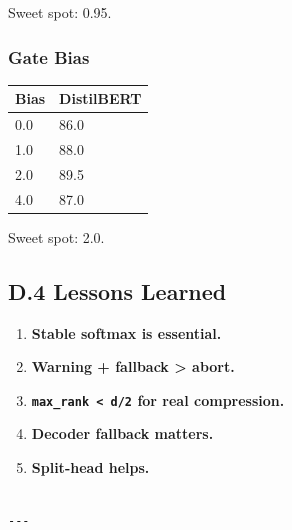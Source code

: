 Sweet spot: 0.95.

\subsubsection{Gate Bias}

\begin{table}[H]
\centering
\small
\begin{tabular}{ll}
\toprule
\textbf{Bias} & \textbf{DistilBERT} \\
\midrule
0.0 & 86.0 \\
1.0 & 88.0 \\
2.0 & 89.5 \\
4.0 & 87.0 \\
\bottomrule
\end{tabular}
\end{table}

Sweet spot: 2.0.

\subsection{D.4 Lessons Learned}

\begin{enumerate}
\item \textbf{Stable softmax is essential.}
\item \textbf{Warning + fallback > abort.}
\item \textbf{\texttt{max\_rank < d/2} for real compression.}
\item \textbf{Decoder fallback matters.}
\item \textbf{Split-head helps.}
\end{enumerate}
\begin{lstlisting}

---
\end{lstlisting}